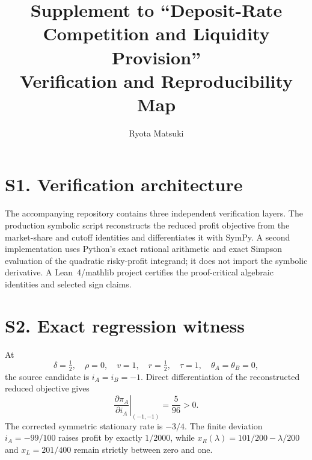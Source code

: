 \documentclass[11pt]{article}
\title{Supplement to “Deposit-Rate Competition and Liquidity Provision”\\Verification and Reproducibility Map}
\author{Ryota Matsuki}
\date{}
\begin{document}
\maketitle

\section*{S1. Verification architecture}
The accompanying repository contains three independent verification layers. The production symbolic script reconstructs the reduced profit objective from the market-share and cutoff identities and differentiates it with SymPy. A second implementation uses Python's exact rational arithmetic and exact Simpson evaluation of the quadratic risky-profit integrand; it does not import the symbolic derivative. A Lean~4/mathlib project certifies the proof-critical algebraic identities and selected sign claims.

\section*{S2. Exact regression witness}
At
\[
\delta=\tfrac12,\quad \rho=0,\quad v=1,\quad r=\tfrac12,\quad
\tau=1,\quad \theta_A=\theta_B=0,
\]
the source candidate is $i_A=i_B=-1$. Direct differentiation of the reconstructed reduced objective gives
\[
\left.\frac{\partial\pi_A}{\partial i_A}\right|_{(-1,-1)}=\frac5{96}>0.
\]
The corrected symmetric stationary rate is $-3/4$. The finite deviation $i_A=-99/100$ raises profit by exactly $1/2000$, while $x_R(\lambda)=101/200-\lambda/200$ and $x_L=201/400$ remain strictly between zero and one.
\end{document}

